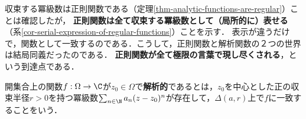 \documentclass[uplatex, dvipdfmx]{jsreport}
\begin{document}
\begin{screen}
    収束する冪級数は正則関数である（定理\ref{thm-analytic-functions-are-regular}）ことは確認したが，
    \textbf{正則関数は全て収束する冪級数として（局所的に）表せる}（系\ref{cor-serial-expression-of-regular-functions}）ことを示す．
    表示が違うだけで，関数として一致するのである．こうして，正則関数と解析関数の２つの世界は結局同義だったのである．
    \textbf{正則関数が全て極限の言葉で現し尽くされる}，という到達点である．
\end{screen}

\begin{definition}[analytic]
    開集合上の関数$f:\Omega\to\C$が$z_0\in\Omega$で\textbf{解析的}であるとは，$z_0$を中心とした正の収束半径$r>0$を持つ冪級数$\sum_{n\in\N}a_n(z-z_0)^n$が存在して，$\Delta(a,r)$上で$f$に一致することをいう．
\end{definition}
\end{document}
